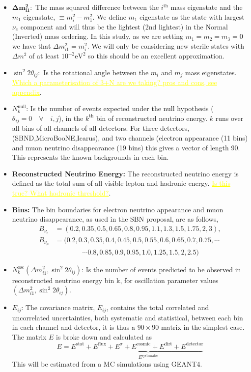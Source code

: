\documentclass[12pt, a4paper]{article}
\newcommand{\newtext}[2]{\textcolor{#1}{\ul{#2}}}
\begin{document}
\begin{itemize}
	\item  $\bm{ \Delta m_{i1}^2:}$ The mass squared difference between the $i^{\text{th}}$ mass eigenstate and the $m_1$ eigenstate, $\equiv m_i^2-m_1^2$. We define $m_1$ eigenstate as the state with largest $\nu_e$ component and will thus be the lightest (2nd lightest) in the Normal (Inverted) mass ordering. In this study, as we are setting $m_1=m_2=m_3=0$ we have that $\Delta m_{i 1}^2 = m_i^2$. We will only be considering new sterile states with $\Delta m^2$ of at least $10^{-2} \text{eV}^2$ so this should be an excellent approximation.
	\item $\sin^2 2 \theta_{ij}: $ Is the rotational angle between the $m_i$ and $m_j$ mass eigenstates. \newtext{MARK}{Which a parameterisation of 3+N are we taking? pros and cons, see appendix}.
	\item $ N^{\text{null}}_k$: Is the number of events expected under the null hypothesis ($\theta_{ij}=0 \quad \forall \quad i,j$), in the $k^\text{th}$ bin of reconstructed neutrino energy. $k$ runs over all bins of all channels of all detectors. For three detectors,  (SBND,MicroBooNE,Icarus), and two channels (electron appearance (11 bins) and muon neutrino disappearance (19 bins) this gives a vector of length 90. This represents the known backgrounds in each bin.
	\item {\bf Reconstructed Neutrino Energy:} The reconstructed neutrino energy is defined as the total sum of all visible lepton and hadronic energy. \newtext{MARK}{Is this true? What hadronic threshold?}.
\item {\bf Bins:} The bin boundaries for electron neutrino appearance and muon neutrino disappearance, as used in the SBN proposal, are as follows,
		\begin{align*}
			B_{\nu_e} &=	(0.2,0.35,0.5,0.65,0.8,0.95,1.1,1.3,1.5,1.75,2,3),\\			
			B_{\nu_\mu}&=	(0.2,0.3,0.35,0.4,0.45,0.5,0.55,0.6,0.65,0.7,0.75,\cdots \\
	      & \qquad \qquad	\cdots		0.8,0.85,0.9,0.95,1.0,1.25,1.5,2,2.5)		
		\end{align*}

	\item  $ N^{\text{osc}}_k (\Delta m_{i1}^2, \sin^2 2 \theta_{ij})$: Is the number of events predicted to be observed in reconstructed neutrino energy bin k, for oscillation parameter values $(\Delta m_{i1}^2, \sin^2 2 \theta_{ij})$.	
	\item $E_{ij}$: The covariance matrix, $E_{ij}$, contains the total correlated and uncorrelated uncertainties, both systematic and statistical, between each bin in each channel and detector, it is thus a $90\times90$ matrix in the simplest case. The matrix $E$ is broke down and calculated as 
		\[
			E = E^\text{stat} + \underbrace{E^\text{flux}+ E^\sigma+ E^\text{cosmic}+E^\text{dirt}+E^\text{detector}}_{E^\text{systematic}}
		\]
		This will be estimated from a MC simulations using GEANT4. 
\end{itemize}
\end{document}
